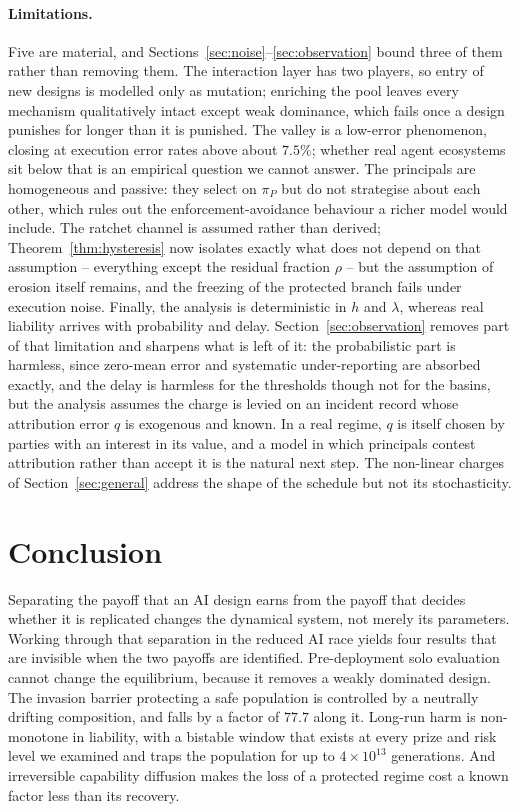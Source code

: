\documentclass[pdflatex]{sn-jnl}
\theoremstyle{thmstyleone}
\theoremstyle{thmstylethree}
\theoremstyle{thmstyletwo}
\newcommand{\piP}{\pi_{P}}
\begin{document}
\paragraph{Limitations.}
Five are material, and Sections~\ref{sec:noise}--\ref{sec:observation} bound three
of them rather than removing them. The interaction layer has two players, so
entry of new designs is modelled only as mutation; enriching the pool leaves
every mechanism qualitatively intact except weak dominance, which fails once a
design punishes for longer than it is punished. The valley is a low-error
phenomenon, closing at execution error rates above about $7.5\%$; whether real
agent ecosystems sit below that is an empirical question we cannot answer.
The principals are homogeneous and passive: they select on $\piP$ but do not
strategise about each other, which rules out the enforcement-avoidance
behaviour a richer model would include. The ratchet channel is assumed rather
than derived; Theorem~\ref{thm:hysteresis} now isolates exactly what does not
depend on that assumption -- everything except the residual fraction $\rho$ --
but the assumption of erosion itself remains, and the freezing of the
protected branch fails under execution noise. Finally, the analysis is
deterministic in $h$ and $\lambda$, whereas real liability arrives with
probability and delay. Section~\ref{sec:observation} removes part of that
limitation and sharpens what is left of it: the probabilistic part is
harmless, since zero-mean error and systematic under-reporting are absorbed
exactly, and the delay is harmless for the thresholds though not for the
basins, but the analysis assumes the charge is levied on an incident record
whose attribution error $q$ is exogenous and known. In a real regime, $q$ is
itself chosen by parties with an interest in its value, and a model in which
principals contest attribution rather than accept it is the natural next step.
The non-linear charges of Section~\ref{sec:general} address the shape of the
schedule but not its stochasticity.

\section{Conclusion}\label{sec:conclusion}

Separating the payoff that an AI design earns from the payoff that decides
whether it is replicated changes the dynamical system, not merely its
parameters. Working through that separation in the reduced AI race yields four
results that are invisible when the two payoffs are identified. Pre-deployment
solo evaluation cannot change the equilibrium, because it removes a weakly
dominated design. The invasion barrier protecting a safe population is
controlled by a neutrally drifting composition, and falls by a factor of
$77.7$ along it. Long-run harm is non-monotone in liability, with a bistable
window that exists at every prize and risk level we examined and traps the
population for up to $4\times10^{13}$ generations. And irreversible capability
diffusion makes the loss of a protected regime cost a known factor less than
its recovery.
\end{document}
